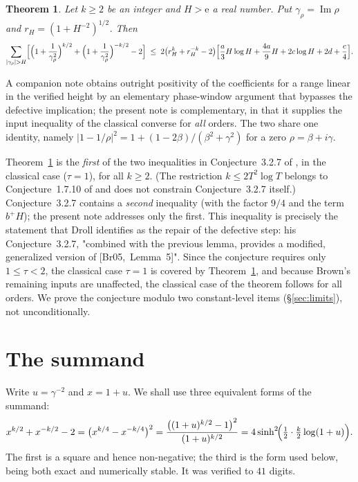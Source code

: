 \documentclass[11pt]{article}
\newtheorem{theorem}{Theorem}
\theoremstyle{definition}
\newcommand{\e}{\mathrm{e}}
\DeclareMathOperator{\Imag}{Im}
\begin{document}
\begin{theorem}\label{thm:main}
Let $k\ge2$ be an integer and $H>\e$ a real number. Put $\gamma_\rho=\Imag\rho$ and
$r_H=(1+H^{-2})^{1/2}$. Then
\[
\sum_{|\gamma_\rho|>H}\Bigl[\Bigl(1+\frac1{\gamma_\rho^{2}}\Bigr)^{k/2}
+\Bigl(1+\frac1{\gamma_\rho^{2}}\Bigr)^{-k/2}-2\Bigr]
\;\le\;
2\bigl(r_H^{k}+r_H^{-k}-2\bigr)
\Bigl[\frac a3 H\log H+\frac{4a}9 H+2c\log H+2d+\frac c4\Bigr].
\]
\end{theorem}

A companion note \cite{BT26a} obtains outright positivity of the coefficients for a range linear in the verified height by an elementary phase-window argument that bypasses the defective implication; the present note is complementary, in that it supplies the input inequality of the classical converse for \emph{all} orders. The two share one identity, namely $|1-1/\rho|^{2}=1+(1-2\beta)/(\beta^{2}+\gamma^{2})$ for a zero $\rho=\beta+i\gamma$.

Theorem~\ref{thm:main} is the \emph{first} of the two inequalities in Conjecture~3.2.7 of \cite{Dr12}, in the classical case ($\tau=1$), for all $k\ge2$. (The restriction $k\le2T^{2}\log T$ belongs to Conjecture~1.7.10 of \cite{Dr12} and does not constrain Conjecture~3.2.7 itself.) Conjecture~3.2.7 contains a \emph{second} inequality (with the factor $9/4$ and the term $b^{+}H$); the present note addresses only the first. This inequality is precisely the statement that Droll identifies as the repair of the defective step:
his Conjecture~3.2.7, "combined with the previous lemma, provides a modified, generalized version of
\mbox{[Br05, Lemma~5]}". Since the conjecture requires only $1\le\tau<2$, the classical case $\tau=1$
is covered by Theorem~\ref{thm:main}, and because Brown's remaining inputs are unaffected, the classical
case of the theorem follows for all orders. We prove the conjecture modulo two constant-level items
(\S\ref{sec:limits}), not unconditionally.

\section{The summand}\label{sec:summand}
Write $u=\gamma^{-2}$ and $x=1+u$. We shall use three equivalent forms of the summand:
\begin{equation}\label{eq:forms}
x^{k/2}+x^{-k/2}-2
=\bigl(x^{k/4}-x^{-k/4}\bigr)^{2}
=\frac{\bigl((1+u)^{k/2}-1\bigr)^{2}}{(1+u)^{k/2}}
=4\sinh^{2}\!\Bigl(\tfrac12\cdot\tfrac k2\log(1+u)\Bigr).
\end{equation}
The first is a square and hence non-negative; the third is the form used below, being both exact and
numerically stable. It was verified to $41$ digits.
\end{document}
